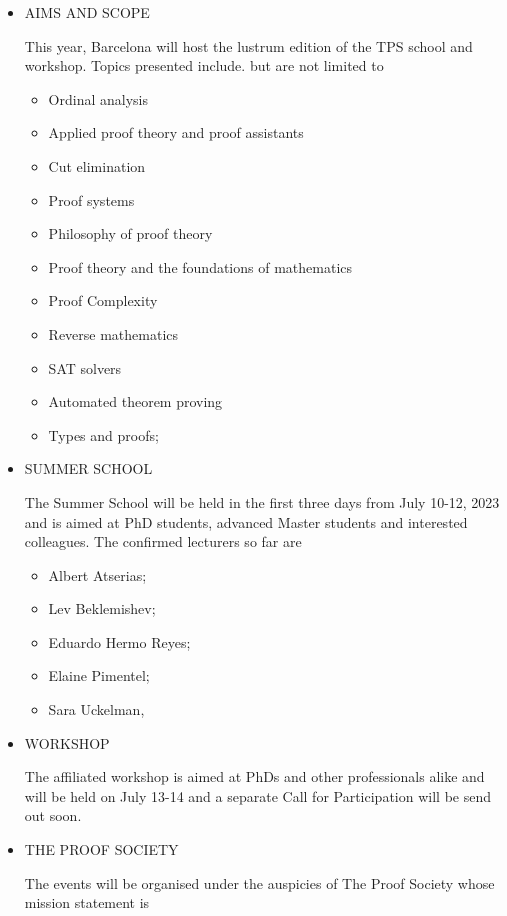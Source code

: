 \documentclass[prodmode,acmtecs]{acmsmall} %
\begin{document}
\begin{itemize}\item  AIMS AND SCOPE 
 
  This year, Barcelona will host the lustrum edition of the TPS school and workshop. Topics presented include. but are not limited to 
 
\begin{itemize}\item  Ordinal analysis
\item  Applied proof theory and proof assistants
\item  Cut elimination
\item  Proof systems
\item  Philosophy of proof theory
\item  Proof theory and the foundations of mathematics
\item  Proof Complexity
\item  Reverse mathematics
\item  SAT solvers
\item  Automated theorem proving
\item  Types and proofs;
\end{itemize} 
\item  SUMMER SCHOOL 
 
  The Summer School will be held in the first three days from July 10-12, 2023 and is aimed at PhD students, advanced Master students and interested colleagues. The confirmed lecturers so far are 
 
\begin{itemize}\item  Albert Atserias;
\item  Lev Beklemishev;
\item  Eduardo Hermo Reyes;
\item  Elaine Pimentel;
\item  Sara Uckelman,
\end{itemize} 
\item  WORKSHOP 
 
  The affiliated workshop is aimed at PhDs and other professionals alike and will be held on July 13-14 and a separate Call for Participation will be send out soon. 
 
\item  THE PROOF SOCIETY 
 
  The events will be organised under the auspicies of The Proof Society whose mission statement is 
 

\end{itemize}
\end{document}
